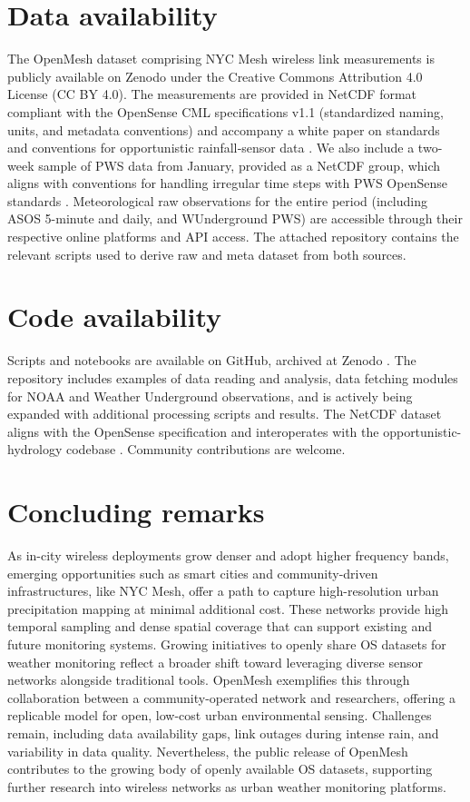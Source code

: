 \documentclass[manuscript]{copernicus}
\begin{document}
\section{Data availability}\label{sec:data_availability}
The OpenMesh dataset comprising NYC Mesh wireless link measurements is publicly available on Zenodo \citep{Jacoby2025OpenMesh} under the Creative Commons Attribution 4.0 License (CC BY 4.0).
The measurements are provided in NetCDF format compliant with the OpenSense CML specifications v1.1 (standardized naming, units, and metadata conventions) and accompany a white paper on standards and conventions for opportunistic rainfall‑sensor data \citep{fencl2023data}. We also include a two-week sample of PWS data from January, provided as a NetCDF group, which aligns with conventions for handling irregular time steps with PWS OpenSense standards \citep{fencl2023data}. Meteorological raw observations for the entire period (including ASOS 5-minute and daily, and WUnderground PWS) are accessible through their respective online platforms and API access. The attached repository contains the relevant scripts used to derive raw and meta dataset from both sources.


\section{Code availability}\label{sec:code_availability}
Scripts and notebooks are available on GitHub, archived at Zenodo \citep{jacoby2025code}. The repository includes examples of data reading and analysis, data fetching modules for NOAA and Weather Underground observations, and is actively being expanded with additional processing scripts and results. The NetCDF dataset aligns with the OpenSense specification and interoperates with the opportunistic-hydrology codebase \citep{opensense_github}. Community contributions are welcome.

\section{Concluding remarks}\label{sec:conclusion} 
As in-city wireless deployments grow denser and adopt higher frequency bands, emerging opportunities such as smart cities and community-driven infrastructures, like NYC Mesh, offer a path to capture high-resolution urban precipitation mapping at minimal additional cost. These networks provide high temporal sampling and dense spatial coverage that can support existing and future monitoring systems.
Growing initiatives to openly share OS datasets for weather monitoring reflect a broader shift toward leveraging diverse sensor networks alongside traditional tools. OpenMesh exemplifies this through collaboration between a community-operated network and researchers, offering a replicable model for open, low-cost urban environmental sensing.
Challenges remain, including data availability gaps, link outages during intense rain, and variability in data quality. Nevertheless, the public release of OpenMesh contributes to the growing body of openly available OS datasets, supporting further research into wireless networks as urban weather monitoring platforms.
\end{document}
